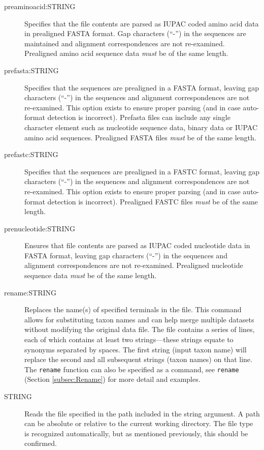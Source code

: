 \begin{description}
		\item [preaminoacid:STRING] Specifies that the file contents are parsed as IUPAC coded amino 
		acid data in prealigned FASTA \citep{PearsonandLipman1988} format. Gap characters (``-'') 
		in the sequences are maintained and alignment correspondences are not re-examined.
		Prealigned amino acid sequence data \textit{must} be of the same length.
	
		\item [prefasta:STRING] Specifies that the sequences are prealigned in a FASTA format, leaving 
		gap characters (``-'') in the sequences and alignment correspondences are not re-examined. 
		This option exists to ensure proper parsing (and in case auto-format detection is incorrect).
		Prefasta files can include any single character element such as nucleotide sequence data, 
		binary data or IUPAC amino acid sequences. Prealigned FASTA files \textit{must} be of the same length. 
			
		\item [prefastc:STRING] Specifies that the sequences are prealigned in a FASTC format, leaving gap 
		characters (``-'') in the sequences and alignment correspondences are not re-examined. 
		This option exists to ensure proper parsing (and in case auto-format detection is incorrect).
		Prealigned FASTC files \textit{must} be of the same length.			
		
		\item [prenucleotide:STRING] Ensures that file contents are parsed as IUPAC coded nucleotide data 
		in FASTA \citep{PearsonandLipman1988} format, leaving gap characters (``-'') in the sequences 
		and alignment correspondences are not re-examined. Prealigned nucleotide sequence data 
		\textit{must} be of the same length.
		
		\item [rename:STRING] Replaces the name(s) of specified terminals in the file. This 
		command allows for substituting taxon names and can help merge multiple datasets without 
		modifying the original data file. The file contains a series of lines, each of which contains at 
		least two strings---these strings equate to synonyms separated by spaces. The first string 
		(input taxon name) will replace the second and all subsequent strings (taxon names) on 
		that line. The \texttt{rename} function can also be specified as a command, see \texttt{rename}
		(Section \ref{subsec:Rename}) for more detail and examples.
					 
		\item[STRING] Reads the file specified in the path included in the string argument. A path 
		can be absolute or relative to the current working directory. The file type is recognized
		automatically, but as mentioned previously, this should be confirmed.


\end{description}
